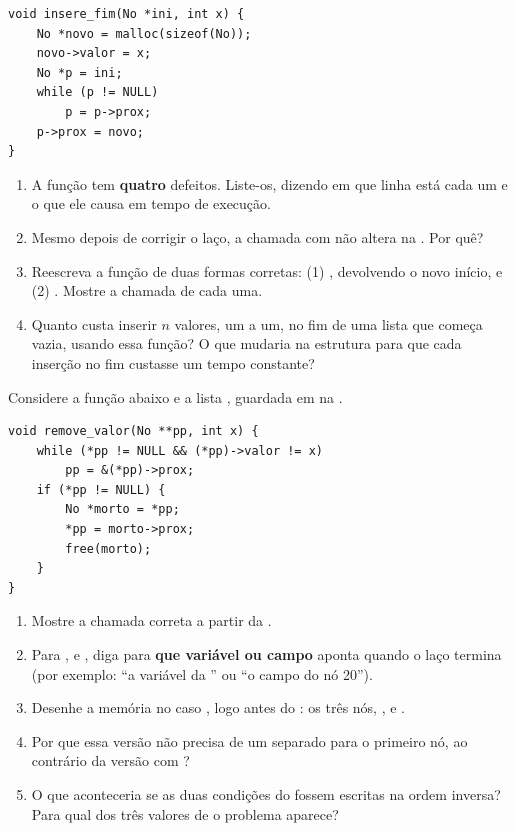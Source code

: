 \documentclass[11pt,a4paper]{article}
\begin{document}
\begin{lstlisting}
void insere_fim(No *ini, int x) {
    No *novo = malloc(sizeof(No));
    novo->valor = x;
    No *p = ini;
    while (p != NULL)
        p = p->prox;
    p->prox = novo;
}
\end{lstlisting}

\begin{enumerate}[label=(\alph*),leftmargin=1.8em,itemsep=1pt]
  \item A função tem \textbf{quatro} defeitos. Liste-os, dizendo em que linha está
        cada um e o que ele causa em tempo de execução.
  \item Mesmo depois de corrigir o laço, a chamada  com
         não altera  na . Por quê?
  \item Reescreva a função de duas formas corretas: (1)
        , devolvendo o novo início, e (2)
        . Mostre a chamada de cada uma.
  \item Quanto custa inserir $n$ valores, um a um, no fim de uma lista que começa
        vazia, usando essa função? O que mudaria na estrutura para que cada inserção
        no fim custasse um tempo constante?
\end{enumerate}

Considere a função abaixo e a lista , guardada em
 na .

\begin{lstlisting}
void remove_valor(No **pp, int x) {
    while (*pp != NULL && (*pp)->valor != x)
        pp = &(*pp)->prox;
    if (*pp != NULL) {
        No *morto = *pp;
        *pp = morto->prox;
        free(morto);
    }
}
\end{lstlisting}

\begin{enumerate}[label=(\alph*),leftmargin=1.8em,itemsep=1pt]
  \item Mostre a chamada correta a partir da .
  \item Para ,  e , diga para \textbf{que variável
        ou campo}  aponta quando o laço termina (por exemplo: ``a variável
         da '' ou ``o campo  do nó 20'').
  \item Desenhe a memória no caso , logo antes do : os três nós,
        ,  e .
  \item Por que essa versão não precisa de um  separado para o primeiro nó,
        ao contrário da versão com ?
  \item O que aconteceria se as duas condições do  fossem escritas na
        ordem inversa? Para qual dos três valores de  o problema aparece?
\end{enumerate}
\end{document}
